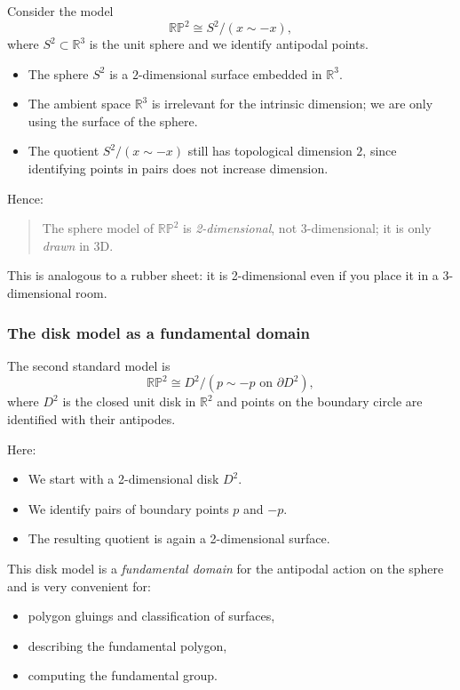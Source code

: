 \documentclass[12pt,a4paper]{article}
\theoremstyle{plain}
\theoremstyle{definition}      %
\begin{document}
	Consider the model
	\[
	\mathbb{RP}^2 \cong S^2 / (x \sim -x),
	\]
	where $S^2 \subset \mathbb{R}^3$ is the unit sphere and we identify antipodal points.
	
	\begin{itemize}
		\item The sphere $S^2$ is a $2$-dimensional surface embedded in $\mathbb{R}^3$.
		\item The ambient space $\mathbb{R}^3$ is irrelevant for the intrinsic
		dimension; we are only using the surface of the sphere.
		\item The quotient $S^2/(x\sim -x)$ still has topological dimension $2$,
		since identifying points in pairs does not increase dimension.
	\end{itemize}
	
	Hence:
	
	\begin{quote}
		The sphere model of $\mathbb{RP}^2$ is \emph{2-dimensional}, not 3-dimensional;
		it is only \emph{drawn} in 3D.
	\end{quote}
	
	This is analogous to a rubber sheet: it is 2-dimensional even if you place it
	in a 3-dimensional room.
	
	\subsubsection{The disk model as a fundamental domain}
	
	The second standard model is
	\[
	\mathbb{RP}^2 \cong D^2 / (p \sim -p \text{ on } \partial D^2),
	\]
	where $D^2$ is the closed unit disk in $\mathbb{R}^2$ and points on the
	boundary circle are identified with their antipodes.
	
	Here:
	
	\begin{itemize}
		\item We start with a 2-dimensional disk $D^2$.
		\item We identify pairs of boundary points $p$ and $-p$.
		\item The resulting quotient is again a 2-dimensional surface.
	\end{itemize}
	
	This disk model is a \emph{fundamental domain} for the antipodal action on
	the sphere and is very convenient for:
	\begin{itemize}
		\item polygon gluings and classification of surfaces,
		\item describing the fundamental polygon,
		\item computing the fundamental group.
	\end{itemize}
	
\end{document}
